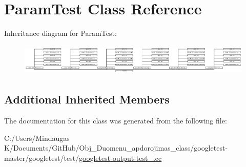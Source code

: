 \hypertarget{class_param_test}{}\section{Param\+Test Class Reference}
\label{class_param_test}
Inheritance diagram for Param\+Test\+:\begin{figure}[H]
\begin{center}
\leavevmode
\includegraphics[height=1.499331cm]{d7/d8d/class_param_test}
\end{center}
\end{figure}
\subsection*{Additional Inherited Members}


The documentation for this class was generated from the following file\+:\begin{DoxyCompactItemize}
\item 
C\+:/\+Users/\+Mindaugas K/\+Documents/\+Git\+Hub/\+Obj\+\_\+\+Duomenu\+\_\+apdorojimas\+\_\+class/googletest-\/master/googletest/test/\mbox{\hyperlink{googletest-master_2googletest_2test_2googletest-output-test___8cc}{googletest-\/output-\/test\+\_\+.\+cc}}\end{DoxyCompactItemize}
